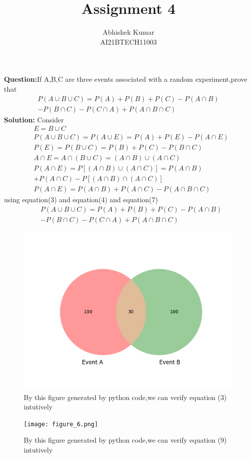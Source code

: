\documentclass[journal, 8pt, twocolumn]{IEEEtran}
\title{Assignment 4 \\}
\author{Abhishek Kumar\\AI21BTECH11003}
\begin{document}
	\maketitle
	\textbf{Question:}If A,B,C are three events associated with a random experiment,prove that 
	\begin{align}
	P(A \cup B \cup C) = P(A)+P(B)+P(C)-P(A \cap B) \nonumber \\-P(B \cap C)-P(C \cap A)+P(A \cap B \cap C)
	\end{align}
	\textbf{Solution:}
	Consider
	\begin{align}
	   &E=B \cup C \\ 
	   &P(A \cup B \cup C)=P(A \cup E)=P(A)+P(E)-P(A \cap E)\\
    &P(E) = P(B \cup C)=P(B)+P(C)-P(B \cap C)\\
    &A \cap E = A \cap (B \cup C) = (A \cap B) \cup (A \cap C)\\
    &P(A \cap E)=P[(A \cap B) \cup (A \cap C)]=P(A \cap B)\\\nonumber
    &+P(A \cap C)-P[(A \cap B) \cap (A \cap C)]\\
    &P(A \cap E) = P(A \cap B)+P(A \cap C) -P(A \cap B \cap C)
	\end{align}
	using equation(3) and equation(4) and equation(7)
	\begin{align}
	&P(A \cup B \cup C)=P(A)+P(B)+P(C)-P(A \cap B)\\\nonumber
	&-P(B \cap C)-P(C \cap A)+P(A \cap B \cap C)
	\end{align}
	
	  \begin{figure}[h]
	    \centering
	    \includegraphics[scale=0.5]{figure_5.png}
	    \caption{By this figure generated by python code,we can verify equation (3) intutively}
	    \label{fig:my_label}
	\end{figure}
	
\begin{figure}[h]
	    \centering
	    \texttt{[image: figure\_6.png]}
	    \caption{By this figure generated by python code,we can verify equation (9) intutively}
	    \label{fig:my_label}
	\end{figure}
\end{document}
